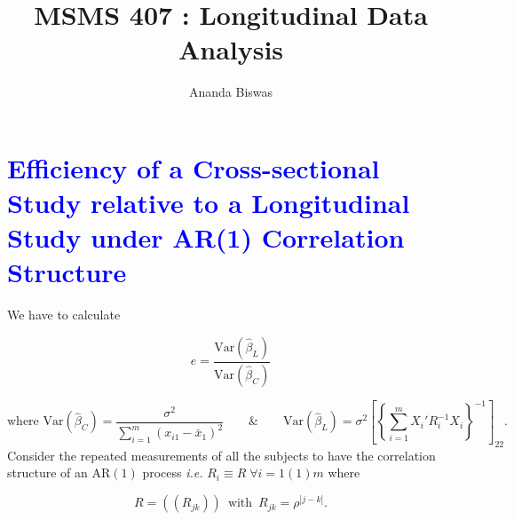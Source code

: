 \documentclass[11pt, a4paper]{article}
\title{MSMS 407 : Longitudinal Data Analysis}
\author{{\fontsize{25}{20} \benyorithafont Ananda Biswas}}
\date{}
\begin{document}
\maketitle

\section*{\faArrowAltCircleRight[regular] \textcolor{blue}{Efficiency of a Cross-sectional Study relative to a Longitudinal Study under AR(1) Correlation Structure}}

We have to calculate 

\begin{equation}
e = \dfrac{\text{Var}(\hat{\beta}_L)}{\text{Var}(\hat{\beta}_C)}
\end{equation}

$$\text{where } \text{Var}(\hat{\beta}_C) = \dfrac{\sigma^2}{\sum \limits_{i = 1}^{m} (x_{i1} - \bar{x}_1)^2} \qquad \& \qquad \text{Var}(\hat{\beta}_L) = \sigma^2 \left[ \left\{\sum \limits_{i = 1}^{m} X_i' R_i^{-1} X_i \right\}^{-1} \right]_{22}.
$$
Consider the repeated measurements of all the subjects to have the correlation structure of an AR$(1)$ process \textit{i.e.} $R_i \equiv R \; \forall i = 1(1)m$ where

$$R = ((R_{jk})) \,\,\, \text{with} \,\,\, R_{jk} = \rho^{|j-k|}.$$
\end{document}
